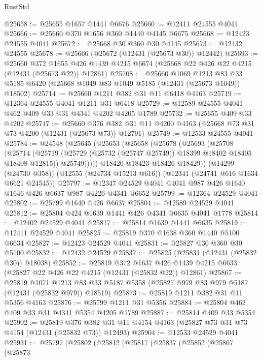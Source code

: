 \begin{lexlean}{RustStd}
\begin{coremodule}
@25658 := @25655 @1657 @1441 @6676
@25660 := @12411 @24555 @4041
@25666 := @25660 @370 @1656 @360 @1440 @4145 @6675
@25668 := @12423 @24555 @4041
@25672 := @25668 @30 @360 @30 @4145
@25673 := @12432 @24555
@25678 := @25666 (@25672 (@12431 (@25673 @30)) @12442)
@25693 := @25660
    @372
    @1655
    @426
    @1439
    @4215
    @6674
    (@25668 @22 @426 @22 @4215 (@12431 (@25673 @22)) @12861)
@25708 := @25660
    @1069
    @1213
    @83
    @33
    @5185
    @6420
    (@25668 @1049 @83 @1049 @5185 (@12431 (@25673 @1049)) @18502)
@25714 := @25660 @1211 @382 @31 @11 @6418 @4163
@25719 := @12364 @24555 @4041 @1211 @31 @6418
@25729 := @12589 @24555 @4041 @462 @409 @33 @31 @4341 @4202 @4205 @1789
@25732 := @25655 @409 @33 @4202
@25747 := @25660
    @376
    @382
    @31
    @11
    @4200
    @4163
    (@25668 @73 @31 @73 @4200 (@12431 (@25673 @73)) @12791)
@25749 := @12533 @24555 @4041
@25784 := @24548
    (@25645
      (@25653
        (@25658
          (@25678
            (@25693
              (@25708
                (@25714
                  (@25719 (@25729 (@25732 (@25747 @25749)) @18399 @18402 @18405 @18408 @12815))
                  @25749)))))
        @18420
        @18423
        @18426
        @18429))
    (@14299 (@24730 @358))
    (@12555 (@24734 @15213 @616))
    (@12341 (@24741 @616 @1634 @6621 @24545))
@25797 := @12347 @24529 @4041 @4041 @987 @426 @1640 @1646 @426 @6637 @987 @4226 @4341 @6652
@25799 := @12364 @24529 @4041
@25802 := @25799 @1640 @426 @6637
@25804 := @12589 @24529 @4041
@25812 := @25804 @424 @1639 @1441 @426 @4341 @6635 @4041 @1778
@25814 := @12402 @24529 @4041
@25817 := @25814 @1639 @1441 @6635
@25819 := @12411 @24529 @4041
@25825 := @25819 @370 @1638 @360 @1440 @5100 @6634
@25827 := @12423 @24529 @4041
@25831 := @25827 @30 @360 @30 @5100
@25832 := @12432 @24529
@25837 := @25825 (@25831 (@12431 (@25832 @30)) @18038)
@25852 := @25819
    @372
    @1637
    @426
    @1439
    @4215
    @6633
    (@25827 @22 @426 @22 @4215 (@12431 (@25832 @22)) @12861)
@25867 := @25819
    @1071
    @1213
    @83
    @33
    @5187
    @5358
    (@25827 @979 @83 @979 @5187 (@12431 (@25832 @979)) @18519)
@25873 := @25819 @1211 @382 @31 @11 @5356 @4163
@25876 := @25799 @1211 @31 @5356
@25884 := @25804 @462 @409 @33 @31 @4341 @5354 @4205 @1789
@25887 := @25814 @409 @33 @5354
@25902 := @25819
    @376
    @382
    @31
    @11
    @4154
    @4163
    (@25827 @73 @31 @73 @4154 (@12431 (@25832 @73)) @12493)
@25904 := @12533 @24529 @4041
@25931 := @25797
    (@25802
      (@25812
        (@25817
          (@25837
            (@25852
              (@25867
                (@25873

\end{coremodule}
\end{lexlean}
